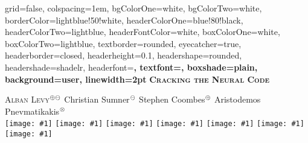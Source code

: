 \documentclass[paperwidth=75cm,paperheight=116.18cm,fontscale=0.40]{baposter}
\def\computer{/Users/pmxal9/}
\def\computer{/Users/pmaal/}
\edef\drop{\computer Dropbox/}
\edef\logos{\drop LogoNoBackground/}
\edef\logoNotts{\logos  notts.png} %
\edef\logoIHR{\logos ihr_3.png}
\edef\logoNETT{\logos NETT.png}
\edef\logoPerso{\logos Logo.png}
\edef\logoRxPz{\logos RxPz.png}
\edef\logoEC{\logos EC.png}
\edef\logoMCA{\logos MCA.png}
\newcounter{counter}
\newcommand*\circled[1]{\tikz[baseline=(char.base)]{%
            \node[shape=circle,draw,inner sep=2pt] (char) {#1};}\,\,}
\newcommand\includelogo[1]{\texttt{[image: \#1]}}
\newcommand\includelogospace[1]{\includelogo{#1}\hspace{18mm}}
\newcommand\titlelogos{%
	\includelogospace{\logoNotts} 
	\includelogospace{\logoIHR} 
 	\includelogospace{\logoPerso} 
 	\includelogospace{\logoRxPz} 
	\includelogospace{\logoNETT}
	\includelogospace{\logoMCA} 
	\includelogo{\logoEC}
}
\begin{document}
 \begin{poster}%
  {
  grid=false,
  colspacing=1em,
  bgColorOne=white,
  bgColorTwo=white,
  borderColor=lightblue!50!white,
  headerColorOne=blue!80!black, %
  headerColorTwo=lightblue,
  headerFontColor=white,
  boxColorOne=white,
  boxColorTwo=lightblue,
  textborder=rounded, %
  eyecatcher=true,
  headerborder=closed,
  headerheight=0.1\textheight,
  headershape=rounded, %
  headershade=shadelr,
  headerfont=\Large\bf\textsc, %
  textfont={\setlength{\parindent}{1em}},
  boxshade=plain,
  background=user,
  linewidth=2pt
  }%
{}%
{%
\bf\textsc{\Huge \textcolor{colorTitle}{Cracking\; the\; Neural\; Code}}
}%
{%
\textcolor{colorTitle}{
	\Large \textsc{Alban Levy}${}^{\oplus\ominus}$  \;\;
	Christian Sumner${}^\ominus$ \;\;
	Stephen Coombes${}^\oplus$ \;\;
	Aristodemos Pnevmatikakis${}^\otimes$
}
	\\[6mm]\titlelogos
}{}  


\newcommand\bul{\noindent$\bullet$\hspace{1mm}}

\newcommand*\circld[1]{\tikz[baseline=(char.base)]{%
            \node[shape=circle,draw,inner sep=2pt] (char) {#1};}\,\,}
        
\setcounter{counterBlock}{1} 
\newcommand\counterIncrem{\raisebox{0.15em}{\small\circld{\arabic{counterBlock}}\addtocounter{counterBlock}{1}}}

\newcommand\ccircled[1]{\small{\circled{#1}}}

\newlength\blocLeft
\setlength\blocLeft{27.0cm}
\newlength\spaceItem
\setlength\spaceItem{-4.6mm}

\newlength\cwidth
\newlength\cheight
\setlength\cwidth{9.0cm} 
\setlength\cheight{5cm} 




\end{poster}
\end{document}
